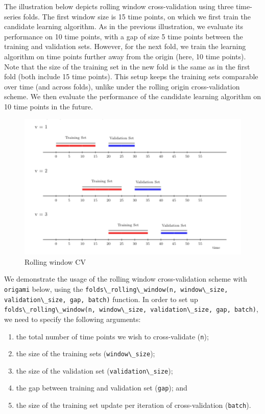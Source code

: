 \documentclass[
  12pt, krantz2,
]{krantz}
\newcommand{\passthrough}[1]{#1}
\providecommand{\tightlist}{%
  \setlength{\itemsep}{0pt}\setlength{\parskip}{0pt}}
\newcommand{\1}{\mathbbm{1}}
\theoremstyle{definition}
\theoremstyle{definition}
\theoremstyle{definition}
\theoremstyle{definition}
\theoremstyle{remark}
\begin{document}
The illustration below depicts rolling window cross-validation using three
time-series folds. The first window size is 15 time points, on which we first
train the candidate learning algorithm. As in the previous illustration, we
evaluate its performance on 10 time points, with a gap of size 5 time points
between the training and validation sets. However, for the next fold, we train
the learning algorithm on time points further away from the origin (here, 10
time points). Note that the size of the training set in the new fold is the same
as in the first fold (both include 15 time points). This setup keeps the
training sets comparable over time (and across folds), unlike under the rolling
origin cross-validation scheme. We then evaluate the performance of the
candidate learning algorithm on 10 time points in the future.

\begin{figure}

{\centering \includegraphics[width=0.8\linewidth]{img/png/rolling_window} 

}

\caption{Rolling window CV}\label{fig:unnamed-chunk-2}
\end{figure}

We demonstrate the usage of the rolling window cross-validation scheme with
\passthrough{\lstinline!origami!} below, using the \passthrough{\lstinline!folds\_rolling\_window(n, window\_size, validation\_size, gap, batch)!} function. In order to set up
\passthrough{\lstinline!folds\_rolling\_window(n, window\_size, validation\_size, gap, batch)!}, we need to
specify the following arguments:

\begin{enumerate}
\def\labelenumi{\arabic{enumi}.}
\tightlist
\item
  the total number of time points we wish to cross-validate (\passthrough{\lstinline!n!});
\item
  the size of the training sets (\passthrough{\lstinline!window\_size!});
\item
  the size of the validation set (\passthrough{\lstinline!validation\_size!});
\item
  the gap between training and validation set (\passthrough{\lstinline!gap!}); and
\item
  the size of the training set update per iteration of cross-validation (\passthrough{\lstinline!batch!}).
\end{enumerate}
\end{document}
